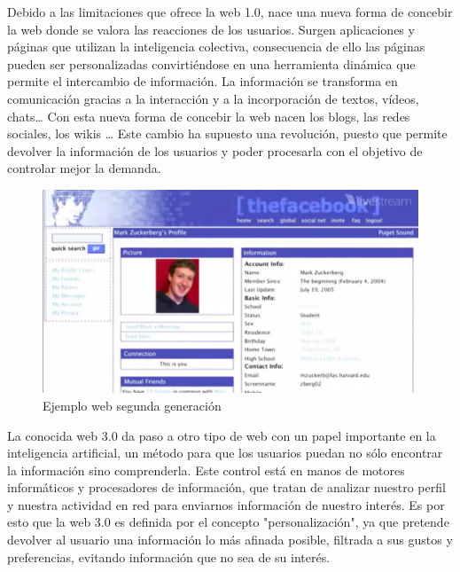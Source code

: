 Debido a las limitaciones que ofrece la web 1.0, nace una nueva forma de concebir la web donde se valora las reacciones de los usuarios. Surgen aplicaciones y páginas que utilizan la inteligencia colectiva, consecuencia de ello las páginas pueden ser personalizadas convirtiéndose en una herramienta dinámica que permite el intercambio de información. La información se transforma en comunicación gracias a la interacción y a la incorporación de textos, vídeos, chats… Con esta nueva forma de concebir la web nacen los blogs, las redes sociales, los wikis … Este cambio ha supuesto una revolución, puesto que permite devolver la información de los usuarios y poder procesarla con el objetivo de controlar mejor la demanda.


\begin{figure}[!h]
    \centering
    \includegraphics[width=140mm]{img/introduccion/web2.jpeg}
    \caption{Ejemplo web segunda generación}
\end{figure}

La conocida web 3.0 da paso a otro tipo de web con un papel importante en la inteligencia artificial, un método para que los usuarios puedan no sólo encontrar la información sino comprenderla. Este control está en manos de motores informáticos y procesadores de información, que tratan de analizar nuestro perfil y nuestra actividad en red para enviarnos información de nuestro interés.
Es por esto que la web 3.0 es definida por el concepto "personalización", ya que pretende devolver al usuario una información lo más afinada posible, filtrada a sus gustos y preferencias, evitando información que no sea de su interés.

